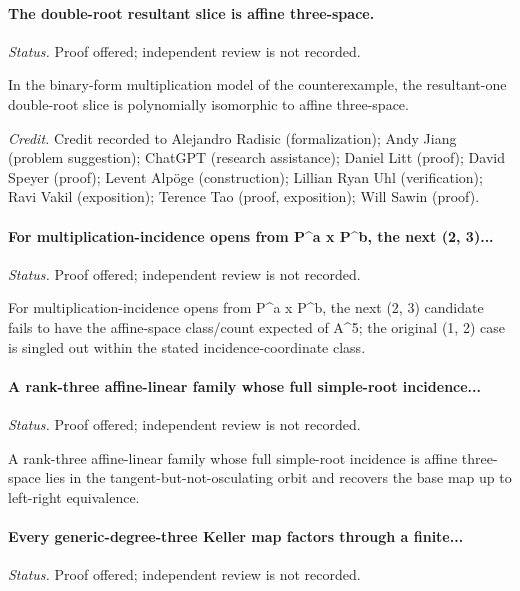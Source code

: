 \label{supp-note-01-003}
\paragraph{The double-root resultant slice is affine three-space.}
\emph{Status.} Proof offered; independent review is not recorded.

In the binary-form multiplication model of the counterexample, the resultant-one double-root slice is polynomially isomorphic to affine three-space.

\emph{Credit.} Credit recorded to Alejandro Radisic (formalization); Andy Jiang (problem suggestion); ChatGPT (research assistance); Daniel Litt (proof); David Speyer (proof); Levent Alpöge (construction); Lillian Ryan Uhl (verification); Ravi Vakil (exposition); Terence Tao (proof, exposition); Will Sawin (proof).

\label{supp-note-01-004}
\paragraph{For multiplication-incidence opens from P\textasciicircum{}a x P\textasciicircum{}b, the next (2, 3)...}
\emph{Status.} Proof offered; independent review is not recorded.

For multiplication-incidence opens from P\textasciicircum{}a x P\textasciicircum{}b, the next (2, 3) candidate fails to have the affine-space class/count expected of A\textasciicircum{}5; the original (1, 2) case is singled out within the stated incidence-coordinate class.

\label{supp-note-01-005}
\paragraph{A rank-three affine-linear family whose full simple-root incidence...}
\emph{Status.} Proof offered; independent review is not recorded.

A rank-three affine-linear family whose full simple-root incidence is affine three-space lies in the tangent-but-not-osculating orbit and recovers the base map up to left-right equivalence.

\label{supp-note-01-006}
\paragraph{Every generic-degree-three Keller map factors through a finite...}
\emph{Status.} Proof offered; independent review is not recorded.

